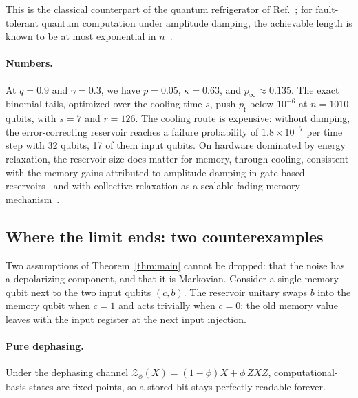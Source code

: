 \documentclass[aps,prl,twocolumn,superscriptaddress,floatfix]{revtex4-2}
\theoremstyle{plain}
\begin{document}
This is the classical counterpart of the quantum refrigerator of Ref.~\cite{BenOr2013}; for fault-tolerant quantum computation under amplitude damping, the achievable length is known to be at most exponential in $n$~\cite{Fawzi2022}.

\paragraph*{Numbers.} At $q=0.9$ and $\gamma=0.3$, we have $p=0.05$, $\kappa=0.63$, and $p_\infty\approx0.135$. The exact binomial tails, optimized over the cooling time $s$, push $p_{\mathrm f}$ below $10^{-6}$ at $n=1010$ qubits, with $s=7$ and $r=126$. The cooling route is expensive: without damping, the error-correcting reservoir reaches a failure probability of $1.8\times10^{-7}$ per time step with 32 qubits, 17 of them input qubits. On hardware dominated by energy relaxation, the reservoir size does matter for memory, through cooling, consistent with the memory gains attributed to amplitude damping in gate-based reservoirs~\cite{Monzani2024} and with collective relaxation as a scalable fading-memory mechanism~\cite{Freiheit2026}.

\subsection{Where the limit ends: two counterexamples}
\label{sm:counter}

Two assumptions of Theorem~\ref{thm:main} cannot be dropped: that the noise has a depolarizing component, and that it is Markovian. Consider a single memory qubit next to the two input qubits $(c,b)$. The reservoir unitary swaps $b$ into the memory qubit when $c=1$ and acts trivially when $c=0$; the old memory value leaves with the input register at the next input injection.

\paragraph*{Pure dephasing.} Under the dephasing channel $\mathcal Z_\phi(X)=(1-\phi)X+\phi\,ZXZ$, computational-basis states are fixed points, so a stored bit stays perfectly readable forever.
\end{document}
